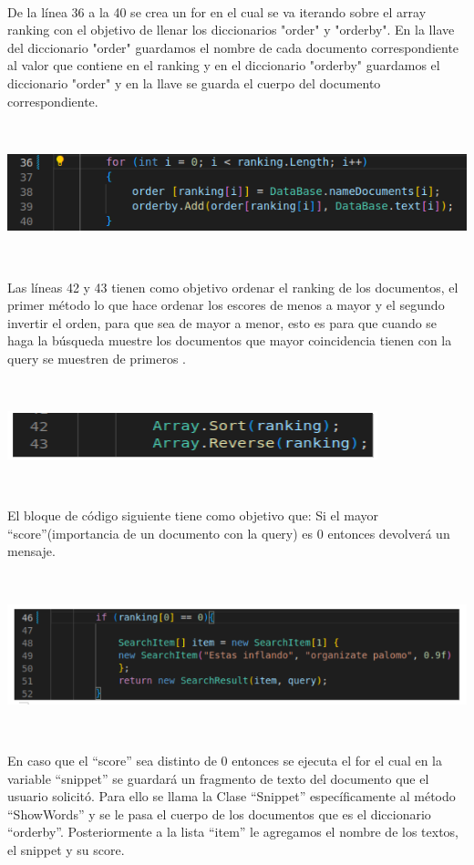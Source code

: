 \documentclass{article}
\begin{document}
{\

De la línea 36 a la 40 se crea un for en el cual se va iterando sobre el array ranking con el objetivo de llenar los diccionarios "order" y "orderby".
En la llave del diccionario "order" guardamos el nombre de cada documento correspondiente al valor que contiene en el ranking y en el diccionario "orderby" guardamos el diccionario "order" 
y en la llave se guarda el cuerpo del documento correspondiente.

\

\centering
\includegraphics[height = 2 cm ]{Captura desde 2023-07-20 00-12-13.png}

\

Las líneas 42 y 43 tienen como objetivo ordenar el ranking de los documentos, el primer método lo que hace ordenar los escores de menos a mayor y el segundo invertir el orden, para que sea de 
mayor a menor, esto es para que cuando se haga la búsqueda muestre los documentos que mayor coincidencia tienen con la query se muestren de primeros .

\

\centering
\includegraphics[height = 1 cm ]{Captura desde 2023-07-19 11-52-28.png}

\

El bloque de código siguiente tiene como objetivo que: Si el mayor “score”(importancia de un documento con la query) es 0 entonces devolverá un mensaje.

\

\centering
\includegraphics[height = 2.5 cm ]{Captura desde 2023-07-19 11-55-34.png}

\

En caso que el “score” sea distinto de 0 entonces se ejecuta el for el cual en la variable “snippet” se guardará un fragmento de texto del documento que el usuario solicitó. Para ello se llama 
la Clase “Snippet” específicamente al método “ShowWords” y se le pasa el cuerpo de los documentos que es el diccionario “orderby”. Posteriormente a la lista “item” le agregamos el nombre de los 
textos, el snippet y su score. 

}
\end{document}
